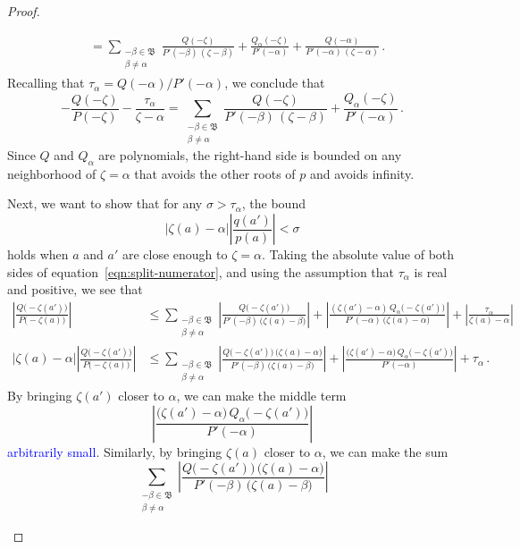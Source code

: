 \documentclass[review]{siamart220329}
\newcommand{\roots}{\mathfrak{B}}
\begin{document}
\begin{proof}
\begin{itemize}
\begin{align*}
&=\sum_{\substack{-\beta \in \roots \\ \beta \neq \alpha}} \frac{Q(-\zeta)}{P'(-\beta)\,(\zeta - \beta)} + \frac{Q_\alpha(-\zeta)}{P'(-\alpha)} + \frac{Q(-\alpha)}{P'(-\alpha)\,(\zeta - \alpha)}\,.
\end{align*}
Recalling that $\tau_\alpha = Q(-\alpha)/P'(-\alpha)$, we conclude that
\[-\frac{Q(-\zeta)}{P(-\zeta)}-\frac{\tau_\alpha}{\zeta-\alpha}=\sum_{\substack{-\beta \in \roots \\ \beta \neq \alpha}} \frac{Q(-\zeta)}{P'(-\beta)\,(\zeta - \beta)} + \frac{Q_\alpha(-\zeta)}{P'(-\alpha)}\,. \]
Since $Q$ and $Q_\alpha$ are polynomials, the right-hand side is bounded on any neighborhood of $\zeta = \alpha$ that avoids the other roots of $p$ and avoids infinity.

Next, we want to show that for any $\sigma > \tau_\alpha$, the bound
\[ |\zeta(a) - \alpha| \left|\frac{q(a')}{p(a)}\right| < \sigma \]
holds when $a$ and $a'$ are close enough to $\zeta = \alpha$. Taking the absolute value of both sides of equation~\eqref{eqn:split-numerator}, and using the assumption that $\tau_\alpha$ is real and positive, we see that
\begin{align*}
\left|\frac{Q\big(-\zeta(a')\big)}{P\big(-\zeta(a)\big)}\right| & \le \sum_{\substack{-\beta \in \roots \\ \beta \neq \alpha}} \left|\frac{Q\big(-\zeta(a')\big)}{P'(-\beta)\,\big(\zeta(a) - \beta\big)}\right| + \left|\frac{(\zeta(a') - \alpha)\,Q_\alpha\big(-\zeta(a')\big)}{P'(-\alpha)\,\big(\zeta(a) - \alpha\big)}\right| + \left|\frac{\tau_\alpha}{\zeta(a) - \alpha}\right| \\
|\zeta(a) - \alpha|\left|\frac{Q\big(-\zeta(a')\big)}{P\big(-\zeta(a)\big)}\right| & \le \sum_{\substack{-\beta \in \roots \\ \beta \neq \alpha}} \left|\frac{Q\big(-\zeta(a')\big)\,\big(\zeta(a) - \alpha\big)}{P'(-\beta)\,\big(\zeta(a) - \beta\big)}\right| + \left|\frac{\big(\zeta(a') - \alpha\big)\,Q_\alpha\big(-\zeta(a')\big)}{P'(-\alpha)}\right| + \tau_\alpha\,.
\end{align*}
By bringing $\zeta(a')$ closer to $\alpha$, we can make the middle term
\[\left|\frac{\big(\zeta(a') - \alpha\big)\,Q_\alpha\big(-\zeta(a')\big)}{P'(-\alpha)}\right|\]
\textcolor{blue}{arbitrarily small}. Similarly, by bringing $\zeta(a)$ closer to $\alpha$, we can make the sum
\[\sum_{\substack{-\beta \in \roots \\ \beta \neq \alpha}} \left|\frac{Q\big(-\zeta(a')\big)\,\big(\zeta(a) - \alpha\big)}{P'(-\beta)\,\big(\zeta(a) - \beta\big)}\right|\]

\end{itemize}
\end{proof}
\end{document}
